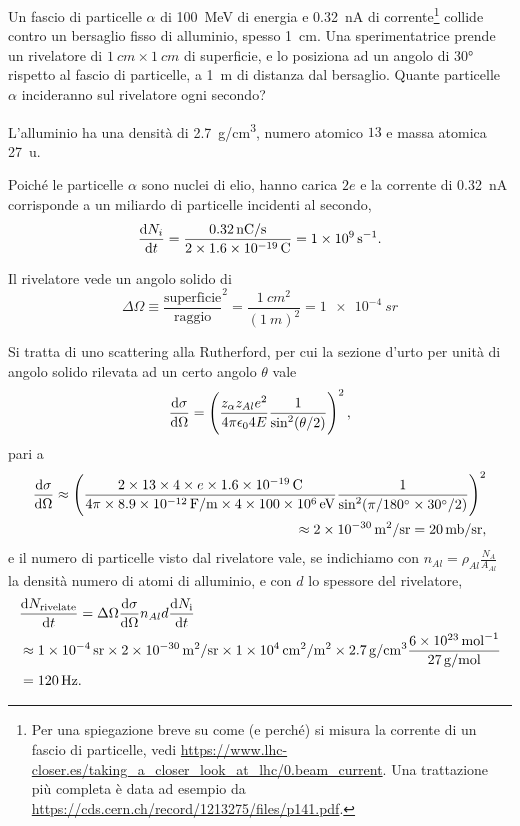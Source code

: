\begin{Exercise}[title={Scattering Rutherford}]
Un fascio di particelle $\alpha$ di \SI{100}{MeV} di energia e \SI{0.32}{nA} di corrente\footnote{Per una spiegazione breve su come (e perché) si misura la corrente di un fascio di particelle, vedi \url{https://www.lhc-closer.es/taking_a_closer_look_at_lhc/0.beam_current}. Una trattazione più completa è data ad esempio da \url{https://cds.cern.ch/record/1213275/files/p141.pdf}.} collide contro un bersaglio fisso di alluminio, spesso \SI{1}{cm}. Una sperimentatrice prende un rivelatore di $\SI{1}{cm}\times\SI{1}{cm}$ di superficie, e lo posiziona ad un angolo di \ang{30} rispetto al fascio di particelle, a \SI{1}{m} di distanza dal bersaglio. Quante particelle $\alpha$ incideranno sul rivelatore ogni secondo?
\end{Exercise}
\begin{Answer}
L'alluminio ha una densità di \SI{2.7}{g/cm^3}, numero atomico $13$ e massa atomica \SI{27}{u}.

Poiché le particelle $\alpha$ sono nuclei di elio, hanno carica $2e$ e la corrente di \SI{0.32}{nA} corrisponde a un miliardo di particelle incidenti al secondo,
\[
\dv{N_i}{t}=\frac{\SI{0.32}{nC/s}}{2\times\SI{1.6e-19}{C}} = \SI{1e9}{s^{-1}}.
\]

Il rivelatore vede un angolo solido di
\[
\Delta\Omega\equiv \frac{\text{superficie}}{\text{raggio}}^2 = \frac{\SI{1}{cm^2}}{(\SI{1}{m})^2} = \SI{1e-4}{sr}
\]

Si tratta di uno scattering alla Rutherford, per cui la sezione d'urto per unità di angolo solido rilevata ad un certo angolo $\theta$ vale
\[
\dv{\sigma}{\Omega} = \left(\frac{z_{\alpha}z_{Al}e^2}{4\pi\epsilon_04E}\frac{1}{\sin^2(\theta/2)}\right)^2,
\]
pari a
\begin{equation}\begin{split}
\dv{\sigma}{\Omega} \approx \left(\frac{2\times13\times4\times e\times\SI{1.6e-19}{C}}{4\pi\times\SI{8.9e-12}{F/m}\times4\times\SI{100e6}{eV}}\frac{1}{\sin^2(\pi/\ang{180}\times\ang{30}/2)}\right)^2\\
\approx \SI{2e-30}{m^2/sr}=\SI{20}{mb/sr},
\end{split}\end{equation}
e il numero di particelle visto dal rivelatore vale, se indichiamo con $n_{Al}=\rho_{Al}\frac{N_A}{A_{Al}}$ la densità numero di atomi di alluminio, e con $d$ lo spessore del rivelatore,
\begin{equation*}
\begin{split}
&\dv{N_\text{rivelate}}{t}=\Delta\Omega\dv{\sigma}{\Omega}n_{Al}d \dv{N_\text{i}}{t}\\ 
&\approx\SI{1e-4}{sr}\times \SI{2e-30}{m^2/sr} \times \SI{1e4}{cm^2/m^2}  \times \SI{2.7}{g/cm^3} \frac{\SI{6e23}{mol^{-1}}}{\SI{27}{g/mol}}\\&= \SI{120}{Hz}.
\end{split}
\end{equation*}
\end{Answer}
